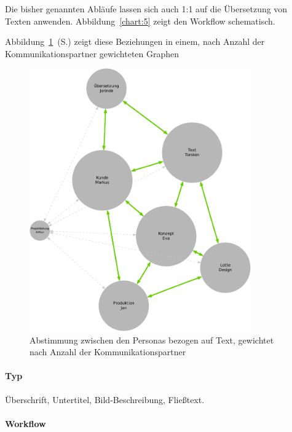 Die bisher genannten Abläufe lassen sich auch 1:1 auf die Übersetzung von Texten anwenden. Abbildung~\ref{chart:5} zeigt den Workflow schematisch.

Abbildung~\ref{chart:personas-gewichtet}~(S.\pageref{chart:personas-gewichtet}) zeigt diese Beziehungen in einem, nach Anzahl der Kommunikationspartner gewichteten Graphen

\begin{figure}[htb]
\begin{center}
\includegraphics[width=0.85\textwidth]{media/personas-gewichtet.pdf}
\caption{Abstimmung zwischen den Personas bezogen auf Text, gewichtet nach Anzahl der Kommunikationspartner}
\label{chart:personas-gewichtet}
\end{center}
\end{figure}

\label{l:textattribute}

\paragraph{Typ} Überschrift, Untertitel, Bild-Beschreibung, Fließtext.

\paragraph{Workflow}

